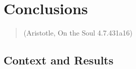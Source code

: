 \chapter{Conclusions}
\label{chapter7}
\thispagestyle{empty}


\begin{quotation}
{\footnotesize
{}
\begin{flushright}
 (Aristotle, On the Soul 4.7.431a16)
\end{flushright}
}
\end{quotation}

\vspace{0.5cm}


\section{Context and Results}

